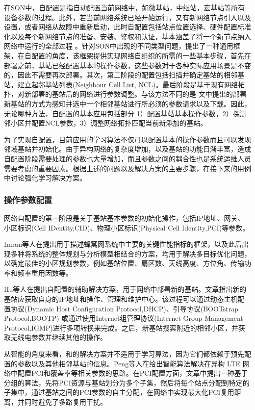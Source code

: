 ﻿\documentclass[11pt,draftclsnofoot,onecolumn,journal,letterpaper]{IEEEtran}
\begin{document}
在SON中，自配置是指自动配置当前网络中，如微基站，中继站，宏基站等所有设备参数的过程。此外，若当前网络系统已经开始运行，又有新网络节点引入以及设置，或者网络从故障中重新启动，此时自配置包括站点位置选择、硬件配置标准化以及每个新网络节点的准备、安装、鉴权和认证，基本涵盖了将一个新节点纳入网络中运行的全部过程 \cite{Aliu2013}。针对SON中出现的不同类型问题，\cite{Wainio2016}提出了一种通用框架，在自配置的角度，该框架提供实现网络自组织的所需的一些基本步骤，首先在部署之前，基站已经配置基本的操作参数，这些参数对于各种实际应用场景是不变的，因此不需要再次部署。其次，第二阶段的配置包括扫描并确定基站的相邻基站，建立起邻基站列表(Neighbour Cell List, NCL)。最后阶段是基于现有网络拓扑，对新部署的基站后的网络进行参数调整。与该方法不同的是 \cite{Hu2010}文中提出的部署新基站的方式为感知并选中一个相邻基站进行所必须的参数请求以及下载。因此，无论哪种方法，自配置的基本应用包括部分 1）配置基站基本操作参数，2）探测邻小区并配置NCL参数，3）调整网络拓扑匹配当前新添加的基站。

为了实现自配置，目前应用的学习算法不仅可以配置基本的操作参数而且可以发现邻域基站并初始化。由于异构网络的复杂度增加，以及基站的功能日渐丰富，造成自配置阶段需要处理的参数也大量增加，而且参数之间的耦合性也是系统运维人员需要考虑的重要因素。根据上述的问题以及解决方案的主要步骤，在接下来的用例中讨论强化学习解决方案。

\subsubsection{操作参数配置}

网络自配置的第一阶段是关于基站基本参数的初始化操作，包括IP地址、网关、小区标识(Cell IDentity,CID)、物理小区标识(Physical Cell Identity,PCI)等参数。

Imran等人在\cite{Imran2013a}提出用于描述蜂窝网系统中主要的关键性能指标的框架，以及此后出现多种将系统的整体规划与分析模型相结合的方案，均用于解决多目标优化问题，以确定最佳的小区规划参数，例如基站位置、扇区数、天线高度、方位角、传输功率和频率重用因数等。

Hu等人在\cite{Hu2010}提出自配置的辅助解决方案，用于网络中部署新的基站。文章指出新的基站应获取自身的IP地址和操作、管理和维护中心。该过程可以通过动态主机配置协议(Dynamic Host Configuration Protocol,DHCP)、引导协议(BOOTstrap Protocol,BOOTP) 或通过使用Internet组管理协议(Internet Group Management Protocol,IGMP)进行多项转换来完成。之后，新基站搜索附近的相邻小区，并获取无线电参数并继续其他的操作。

从智能的角度来看，\cite{Wainio2016}和\cite{Hu2010}的解决方案并不适用于学习算法，因为它们都依赖于预先配置的参数以及其他相邻基站的信息。Peng等人在\cite{Peng2013}给出智能算法解决在异构 LTE 网络中配置PCI和覆盖率等相关参数的思路。在PCI配置方面，文章中提出一种基于分组的算法，先将PCI资源与基站划分为多个子集，然后将每个站点分配到特定的子集中，通过基站之间的PCI参数的自主分配，在网络中实现最大化PCI复用距离，并同时避免了多路复用干扰。
\end{document}
